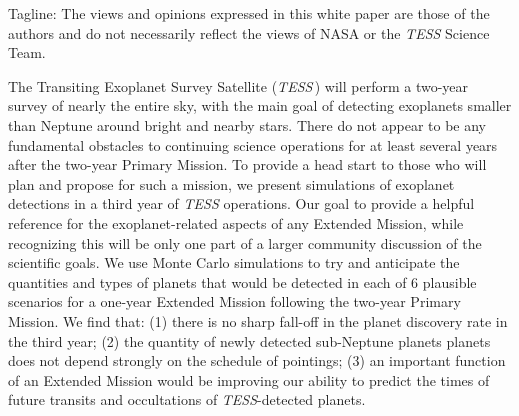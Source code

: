 \documentclass{article}
\begin{document}
Tagline: The views and opinions expressed in this white paper are those of the 
authors and do not necessarily reflect the views of NASA or the {\it TESS}
Science Team.

The Transiting Exoplanet Survey Satellite ({\it TESS}\,) will perform
a two-year survey of nearly the entire sky, with the main goal of detecting
exoplanets smaller than Neptune around bright and nearby stars. There do
not appear to be any fundamental obstacles to continuing science
operations for at least several years after the two-year Primary Mission.
To provide a head start to those who will plan and propose for such a 
mission, we present simulations of exoplanet detections in a third year of {\it 
TESS}
operations. Our goal to provide a helpful reference for the exoplanet-related
aspects of any Extended Mission, while recognizing this will be only one part of
a larger community discussion of the scientific goals.
We use Monte Carlo simulations to try and anticipate the quantities and types
of planets that would be detected in each of 6 plausible scenarios for a
one-year Extended Mission following the two-year Primary Mission.
We find that: (1) there is no
sharp fall-off in the planet discovery rate in the third year; (2) the quantity 
of newly detected sub-Neptune planets
planets does not depend strongly on the schedule of pointings; (3) an important
function of an Extended Mission would be improving our ability to predict the times of future
transits and occultations of {\it TESS}-detected planets.
\end{document}
